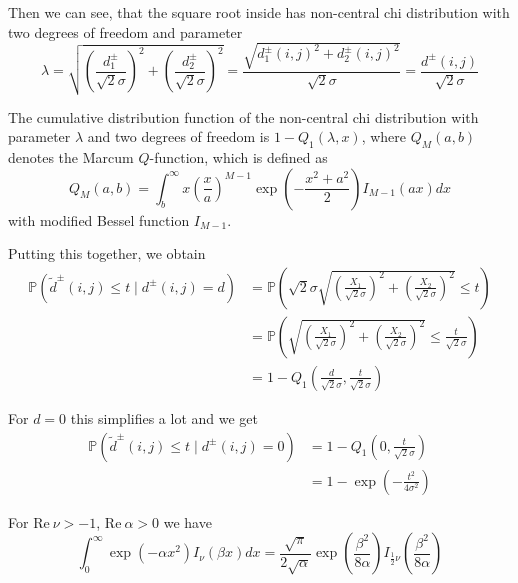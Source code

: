 \documentclass[a4paper,12pt]{article}
\theoremstyle{plain}
\theoremstyle{definition}
\theoremstyle{remark}
\begin{document}
	Then we can see, that the square root inside has non-central chi distribution with two degrees of freedom and parameter
	\begin{equation*}
		\lambda = \sqrt{\left( \frac{d_1^\pm}{\sqrt{2} \sigma} \right)^2 + \left( \frac{d_2^\pm}{\sqrt{2} \sigma} \right)^2} = \frac{\sqrt{d_1^\pm(i, j)^2 + d_2^\pm(i, j)^2}}{\sqrt{2} \sigma} = \frac{d^\pm(i, j)}{\sqrt{2} \sigma}
	\end{equation*}
	
	The cumulative distribution function of the non-central chi distribution with parameter $\lambda$ and two degrees of freedom is $1 - Q_1(\lambda, x)$, where $Q_M(a, b)$ denotes the Marcum $Q$-function, which is defined as
	\begin{equation*}
		Q_M(a, b) = \int_b^\infty x \left( \frac{x}{a} \right)^{M-1} \exp \left( - \frac{x^2 + a^2}{2} \right) I_{M-1}(ax) dx
	\end{equation*}
	with modified Bessel function $I_{M-1}$.
	
	Putting this together, we obtain
	\begin{align*}
		\mathbb{P}(\tilde{d}^\pm(i, j) \leq t \mid d^\pm(i, j) = d) &= \mathbb{P}\left( \sqrt{2} \sigma \sqrt{\left( \frac{X_1}{\sqrt{2} \sigma} \right)^2 + \left( \frac{X_2}{\sqrt{2} \sigma} \right)^2} \leq t \right) \\
		&= \mathbb{P}\left( \sqrt{\left( \frac{X_1}{\sqrt{2} \sigma} \right)^2 + \left( \frac{X_2}{\sqrt{2} \sigma} \right)^2} \leq \frac{t}{\sqrt{2} \sigma} \right) \\
		&= 1 - Q_1 \left( \frac{d}{\sqrt{2} \sigma}, \frac{t}{\sqrt{2} \sigma} \right)
	\end{align*}
	
	For $d = 0$ this simplifies a lot and we get
	\begin{align*}
		\mathbb{P}(\tilde{d}^\pm(i, j) \leq t \mid d^\pm(i, j) = 0) &= 1 - Q_1 \left( 0, \frac{t}{\sqrt{2} \sigma} \right) \\
		&= 1 - \exp \left( - \frac{t^2}{4 \sigma^2} \right)
	\end{align*}
	
	\newpage
	
	For $\mathrm{Re} \ \nu > -1$, $\mathrm{Re} \ \alpha > 0$ we have
	\begin{equation*}
		\int_0^\infty \exp \left( - \alpha x^2 \right) I_\nu ( \beta x ) dx = \frac{\sqrt{\pi}}{2 \sqrt{\alpha}} \exp \left( \frac{\beta^2}{8 \alpha} \right) I_{\frac{1}{2} \nu} \left( \frac{\beta^2}{8 \alpha} \right)
	\end{equation*}
	
\end{document}

